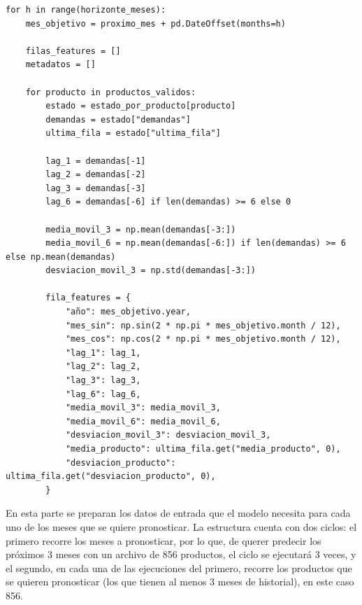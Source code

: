 \label{lst:features_pronostico_futuro}
\begin{verbatim}
for h in range(horizonte_meses):
    mes_objetivo = proximo_mes + pd.DateOffset(months=h)

    filas_features = []
    metadatos = []

    for producto in productos_validos:
        estado = estado_por_producto[producto]
        demandas = estado["demandas"]
        ultima_fila = estado["ultima_fila"]

        lag_1 = demandas[-1]
        lag_2 = demandas[-2]
        lag_3 = demandas[-3]
        lag_6 = demandas[-6] if len(demandas) >= 6 else 0

        media_movil_3 = np.mean(demandas[-3:])
        media_movil_6 = np.mean(demandas[-6:]) if len(demandas) >= 6 else np.mean(demandas)
        desviacion_movil_3 = np.std(demandas[-3:])

        fila_features = {
            "año": mes_objetivo.year,
            "mes_sin": np.sin(2 * np.pi * mes_objetivo.month / 12),
            "mes_cos": np.cos(2 * np.pi * mes_objetivo.month / 12),
            "lag_1": lag_1,
            "lag_2": lag_2,
            "lag_3": lag_3,
            "lag_6": lag_6,
            "media_movil_3": media_movil_3,
            "media_movil_6": media_movil_6,
            "desviacion_movil_3": desviacion_movil_3,
            "media_producto": ultima_fila.get("media_producto", 0),
            "desviacion_producto": ultima_fila.get("desviacion_producto", 0),
        }
\end{verbatim}

En esta parte se preparan los datos de entrada que el modelo necesita para cada uno de los meses que se quiere pronosticar. La estructura cuenta con dos ciclos: el primero recorre los meses a pronosticar, por lo que, de querer predecir los próximos 3 meses con un archivo de 856 productos, el ciclo se ejecutará 3 veces, y el segundo, en cada una de las ejecuciones del primero, recorre los productos que se quieren pronosticar (los que tienen al menos 3 meses de historial), en este caso 856.

